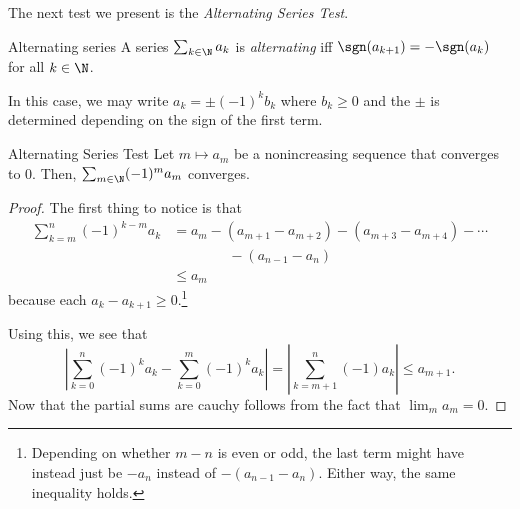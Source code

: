The next test we present is the \emph{Alternating Series Test}.
\begin{dfn}{Alternating series}{}
A series $\sum _{k\in \N}a_k$ is \emph{alternating} iff $\sgn (a_{k+1})=-\sgn (a_k)$ for all $k\in \N$.
\begin{rmk}
In this case, we may write $a_k=\pm (-1)^kb_k$ where $b_k\geq 0$ and the $\pm$ is determined depending on the sign of the first term.
\end{rmk}
\end{dfn}
\begin{prp}{Alternating Series Test}{}
Let $m\mapsto a_m$ be a nonincreasing sequence that converges to $0$.  Then, $\sum _{m\in \N}(-1)^ma_m$ converges.
\begin{proof}
The first thing to notice is that
\begin{equation}
\begin{split}
\sum _{k=m}^n(-1)^{k-m}a_k & =a_m-(a_{m+1}-a_{m+2})-(a_{m+3}-a_{m+4})-\cdots \\ & \qquad \qquad -(a_{n-1}-a_n) \\
& \leq a_m
\end{split}
\end{equation}
because each $a_k-a_{k+1}\geq 0$.\footnote{Depending on whether $m-n$ is even or odd, the last term might have instead just be $-a_n$ instead of $-(a_{n-1}-a_n)$.  Either way, the same inequality holds.}

Using this, we see that
\begin{equation}
\left| \sum _{k=0}^n(-1)^ka_k-\sum _{k=0}^m(-1)^ka_k\right| =\left| \sum _{k=m+1}^n(-1)a_k\right| \leq a_{m+1}.
\end{equation}
Now that the partial sums are cauchy follows from the fact that $\lim _ma_m=0$.
\end{proof}
\end{prp}
